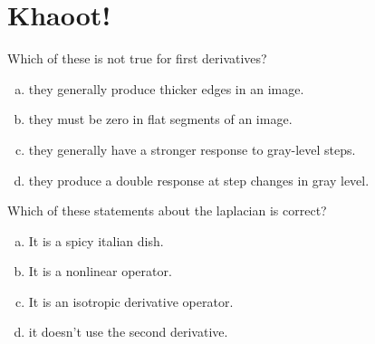 \section{Khaoot!}
Which of these is not true for first derivatives?
\begin{enumerate}[(a)]
    \item they generally produce thicker edges in an image.
    \item they must be zero in flat segments of an image.
    \item they generally have a stronger response to gray-level steps.
    \item they produce a double response at step changes in gray level.
\end{enumerate}


Which of these statements about the laplacian is correct?
\begin{enumerate}[(a)]
    \item It is a spicy italian dish.
    \item It is a nonlinear operator.
    \item It is an isotropic derivative operator.
    \item it doesn't use the second derivative.
\end{enumerate}
